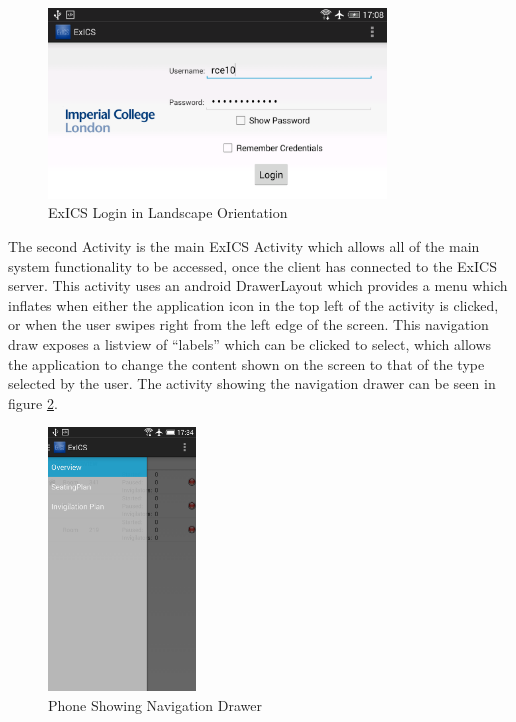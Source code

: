 \begin{figure}[h]
	\centering
	\includegraphics[width=0.8\textwidth]{"screenshots/login_landscape"}
	\caption{ExICS Login in Landscape Orientation}
	\label{fig:login_landscape}
\end{figure}

\FloatBarrier

\FloatBarrier

The second Activity is the main ExICS Activity which allows all of the main system functionality to be accessed, once the client has connected to the ExICS server.  This activity uses an android DrawerLayout\cite{navdrawer} which provides a menu which inflates when either the application icon in the top left of the activity is clicked, or when the user swipes right from the left edge of the screen.  This navigation draw exposes a listview of ``labels'' which can be clicked to select, which allows the application to change the content shown on the screen to that of the type selected by the user.  The activity showing the navigation drawer can be seen in figure \ref{fig:phone_nav_drawer}.

\begin{figure}
	\centering
	\includegraphics[width=0.35\textwidth]{"screenshots/phone_portrait_nav_drawer"}
	\caption{Phone Showing Navigation Drawer}
	\label{fig:phone_nav_drawer}
\end{figure}

